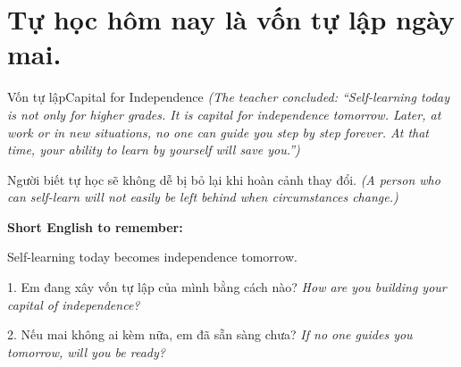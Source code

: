 \section{Tự học hôm nay là vốn tự lập ngày mai.}
\begin{truyen}{Vốn tự lập}{Capital for Independence}
\textit{(The teacher concluded: ``Self-learning today is not only for higher grades. It is capital for independence tomorrow. Later, at work or in new situations, no one can guide you step by step forever. At that time, your ability to learn by yourself will save you.'')}
\end{truyen}

\begin{baihoc}
Người biết tự học sẽ không dễ bị bỏ lại khi hoàn cảnh thay đổi.
\textit{(A person who can self-learn will not easily be left behind when circumstances change.)}
\end{baihoc}

\begin{ghinhoanh}
\textbf{Short English to remember:}

Self-learning today becomes independence tomorrow.

\end{ghinhoanh}

\begin{tuhocnhanh}
1. Em đang xây vốn tự lập của mình bằng cách nào? \textit{How are you building your capital of independence?}

2. Nếu mai không ai kèm nữa, em đã sẵn sàng chưa? \textit{If no one guides you tomorrow, will you be ready?}
\end{tuhocnhanh}
\ngancach